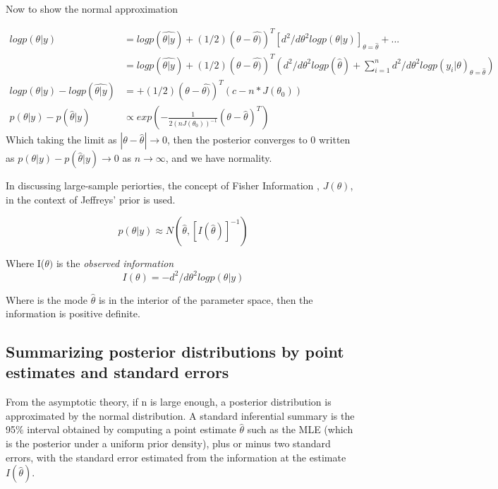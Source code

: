 \documentclass[
]{book}
\theoremstyle{definition}
\theoremstyle{definition}
\theoremstyle{definition}
\theoremstyle{definition}
\theoremstyle{remark}
\begin{document}
Now to show the normal approximation

\[
 \begin{aligned}
log p(\theta|y) &= log p(\hat{\theta|y}) + (1/2)(\theta-\hat{\theta)})^T[ d^2/d\theta^2 log p(\theta|y)]_{\theta=\hat{\theta}}+... \\
 &= log p(\hat{\theta|y}) + (1/2)(\theta-\hat{\theta)})^T ( d^2/d\theta^2 log p(\hat{\theta}) + \sum_{i=1}^n d^2/d\theta^2 log p(y_i | \theta)_{\theta=\hat{\theta}} ) \\
 log p(\theta|y)  - log p(\hat{\theta|y}) &= + (1/2)(\theta-\hat{\theta)})^T (c  -n* J(\theta_0)) \\
  p(\theta|y ) - p(\hat{\theta}|y) &\propto exp( -\frac{1}{2(nJ(\theta_0))^{-1}}(\theta-\hat{\theta})^T)
 \end{aligned}
\]
Which taking the limit as \(|\theta -\hat{\theta}| \to 0\), then the posterior converges to 0 written as \(p(\theta|y )- p(\hat{\theta}|y) \to 0\) as \(n \to \infty\), and we have normality.

In discussing large-sample periorties, the concept of Fisher Information , \(J(\theta)\), in the context of Jeffreys' prior is used.

\begin{equation}
p(\theta|y) \approx N(\hat{\theta}, [I(\hat{\theta})]^{-1})
\label{eq:normalapprox}
\end{equation}

Where I(\(\theta)\) is the \emph{observed information}
\begin{equation}
I(\theta)= -d^2/d\theta^2 log p(\theta|y) 
\end{equation}

Where is the mode \(\hat{\theta}\) is in the interior of the parameter space, then the information is positive definite.

\hypertarget{summarizing-posterior-distributions-by-point-estimates-and-standard-errors}{%
\subsection*{Summarizing posterior distributions by point estimates and standard errors}\label{summarizing-posterior-distributions-by-point-estimates-and-standard-errors}}

From the asymptotic theory, if n is large enough, a posterior distribution is approximated by the normal distribution. A standard inferential summary is the 95\(\%\) interval obtained by computing a point estimate \(\hat{\theta}\) such as the MLE (which is the posterior under a uniform prior density), plus or minus two standard errors, with the standard error estimated from the information at the estimate \(I(\hat{\theta})\).
\end{document}
